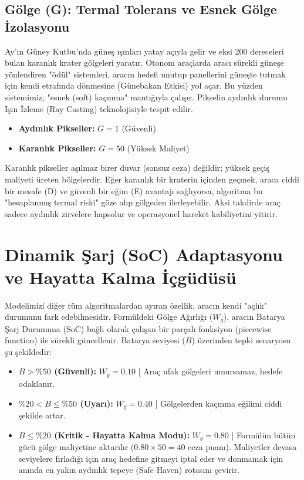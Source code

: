 \documentclass[12pt,a4paper]{article}
\begin{document}
\subsection{Gölge (G): Termal Tolerans ve Esnek Gölge İzolasyonu}
Ay’ın Güney Kutbu’nda güneş ışınları yatay açıyla gelir ve eksi 200 dereceleri bulan karanlık krater gölgeleri yaratır. Otonom araçlarda aracı sürekli güneşe yönlendiren "ödül" sistemleri, aracın hedefi unutup panellerini güneşte tutmak için kendi etrafında dönmesine (Günebakan Etkisi) yol açar. Bu yüzden sistemimiz, "esnek (soft) kaçınma" mantığıyla çalışır. Pikselin aydınlık durumu Işın İzleme (Ray Casting) teknolojisiyle tespit edilir.
\begin{itemize}
    \item \textbf{Aydınlık Pikseller:} $G = 1$ (Güvenli)
    \item \textbf{Karanlık Pikseller:} $G = 50$ (Yüksek Maliyet)
\end{itemize}
Karanlık pikseller aşılmaz birer duvar (sonsuz ceza) değildir; yüksek geçiş maliyeti üreten bölgelerdir. Eğer karanlık bir kraterin içinden geçmek, araca ciddi bir mesafe (D) ve güvenli bir eğim (E) avantajı sağlıyorsa, algoritma bu "hesaplanmış termal riski" göze alıp gölgeden ilerleyebilir. Aksi takdirde araç sadece aydınlık zirvelere hapsolur ve operasyonel hareket kabiliyetini yitirir.

\newpage

\section{Dinamik Şarj (SoC) Adaptasyonu ve Hayatta Kalma İçgüdüsü}
Modelimizi diğer tüm algoritmalardan ayıran özellik, aracın kendi "açlık" durumunu fark edebilmesidir. Formüldeki Gölge Ağırlığı ($W_g$), aracın Batarya Şarj Durumuna (SoC) bağlı olarak çalışan bir parçalı fonksiyon (piecewise function) ile sürekli güncellenir. Batarya seviyesi ($B$) üzerinden tepki senaryosu şu şekildedir:
\begin{itemize}
    \item \textbf{$B > \%50$ (Güvenli):} $W_g = 0.10$ | Araç ufak gölgeleri umursamaz, hedefe odaklanır.
    \item \textbf{$\%20 < B \le \%50$ (Uyarı):} $W_g = 0.40$ | Gölgelerden kaçınma eğilimi ciddi şekilde artar.
    \item \textbf{$B \le \%20$ (Kritik - Hayatta Kalma Modu):} $W_g = 0.80$ | Formülün bütün gücü gölge maliyetine aktarılır ($0.80 \times 50 = 40$ ceza puanı). Maliyetler devasa seviyelere fırladığı için araç hedefine gitmeyi iptal eder ve donmamak için anında en yakın aydınlık tepeye (Safe Haven) rotasını çevirir.
\end{itemize}
\end{document}
